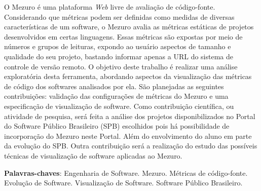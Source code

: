 \begin{resumo}
 O Mezuro é uma plataforma \textit{Web} livre de avaliação de código-fonte.
 Considerando que métricas podem ser definidas como medidas de diversas
 características de um software, o Mezuro avalia as métricas estáticas de
 projetos desenvolvidos em certas linguagens. Essas métricas são expostas por
 meio de números e grupos de leituras, expondo ao usuário aspectos de tamanho e
 qualidade do seu projeto, bastando informar apenas a URL do sistema de controle
 de versão remoto.
 O objetivo deste trabalho é realizar uma análise exploratória desta ferramenta,
 abordando aspectos da visualização das métricas de código dos softwares
 analisados por ela.
 São planejadas as seguintes contribuições: validação das configurações de
 métricas do Mezuro e uma especificação de visualização de software.
 Como contribuição científica, ou atividade de pesquisa, será feita a análise
 dos projetos disponibilizados no Portal do Software Público Brasileiro (SPB)
 escolhidos pois há possibilidade de incorporação do Mezuro neste Portal. Além
 do envolvimento do aluno em parte da evolução do SPB.
 Outra contribuição será a realização do estudo das possíveis técnicas de
 visualização de software aplicadas ao Mezuro.

 \vspace{\onelineskip}

 \noindent
 \textbf{Palavras-chaves}: Engenharia de Software. Mezuro.
 Métricas de código-fonte. Evolução de Software. Visualização de Software.
 Software Público Brasileiro.
\end{resumo}
